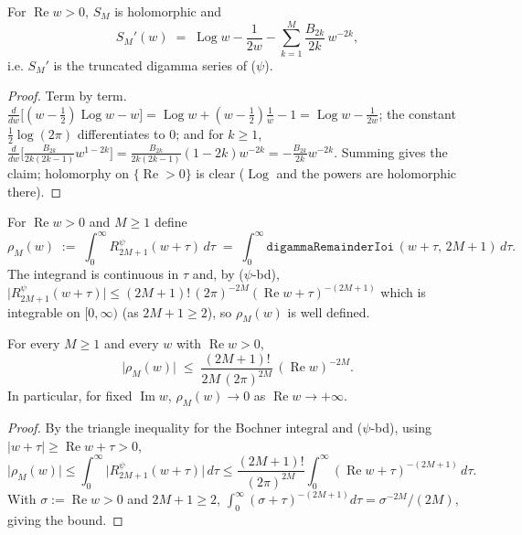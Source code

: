 \begin{lemma}
\label{lem:hz_stirling_deriv}
\leanok
{}
For $\operatorname{Re}w>0$, $S_M$ is holomorphic and
\[
  S_M'(w)\;=\;\operatorname{Log}w-\frac1{2w}-\sum_{k=1}^{M}\frac{B_{2k}}{2k}\,w^{-2k},
\]
i.e. $S_M'$ is the truncated digamma series of \textup{($\psi$)}.
\end{lemma}

\begin{proof}
\leanok
Term by term. $\tfrac{d}{dw}\bigl[(w-\tfrac12)\operatorname{Log}w-w\bigr]
=\operatorname{Log}w+(w-\tfrac12)\tfrac1w-1=\operatorname{Log}w-\tfrac1{2w}$; the
constant $\tfrac12\log(2\pi)$ differentiates to $0$; and for $k\ge1$,
$\tfrac{d}{dw}\bigl[\tfrac{B_{2k}}{2k(2k-1)}w^{1-2k}\bigr]
=\tfrac{B_{2k}}{2k(2k-1)}(1-2k)w^{-2k}=-\tfrac{B_{2k}}{2k}w^{-2k}$. Summing gives
the claim; holomorphy on $\{\operatorname{Re}>0\}$ is clear ($\operatorname{Log}$ and
the powers are holomorphic there).
\end{proof}

\begin{definition}
\label{def:hz_remainder}
\leanok
{}
For $\operatorname{Re}w>0$ and $M\ge1$ define
\[
  \rho_M(w)\;:=\;\int_0^{\infty} R^{\psi}_{2M+1}(w+\tau)\,d\tau
    \;=\;\int_0^{\infty}\texttt{digammaRemainderIoi}\,(w+\tau,\,2M+1)\,d\tau .
\]
The integrand is continuous in $\tau$ and, by \textup{($\psi$-bd)},
$\bigl|R^{\psi}_{2M+1}(w+\tau)\bigr|\le (2M+1)!\,(2\pi)^{-2M}(\operatorname{Re}w+\tau)^{-(2M+1)}$
which is integrable on $[0,\infty)$ (as $2M+1\ge2$), so $\rho_M(w)$ is well defined.
\end{definition}

\begin{theorem}
\label{thm:hz_loggamma_bound}
\leanok
{}
For every $M\ge1$ and every $w$ with $\operatorname{Re}w>0$,
\[
  \bigl|\rho_M(w)\bigr|\;\le\;\frac{(2M+1)!}{2M\,(2\pi)^{2M}}\,(\operatorname{Re}w)^{-2M}.
\]
In particular, for fixed $\operatorname{Im}w$, $\rho_M(w)\to0$ as $\operatorname{Re}w\to+\infty$.
\end{theorem}

\begin{proof}
\leanok
{}
By the triangle inequality for the Bochner integral and
\textup{($\psi$-bd)}, using $\lvert w+\tau\rvert\ge\operatorname{Re}w+\tau>0$,
\[
  \bigl|\rho_M(w)\bigr|
  \le\int_0^\infty\bigl|R^{\psi}_{2M+1}(w+\tau)\bigr|\,d\tau
  \le\frac{(2M+1)!}{(2\pi)^{2M}}\int_0^\infty(\operatorname{Re}w+\tau)^{-(2M+1)}\,d\tau .
\]
With $\sigma:=\operatorname{Re}w>0$ and $2M+1\ge2$,
$\int_0^\infty(\sigma+\tau)^{-(2M+1)}d\tau=\sigma^{-2M}/(2M)$, giving the bound.
\end{proof}

